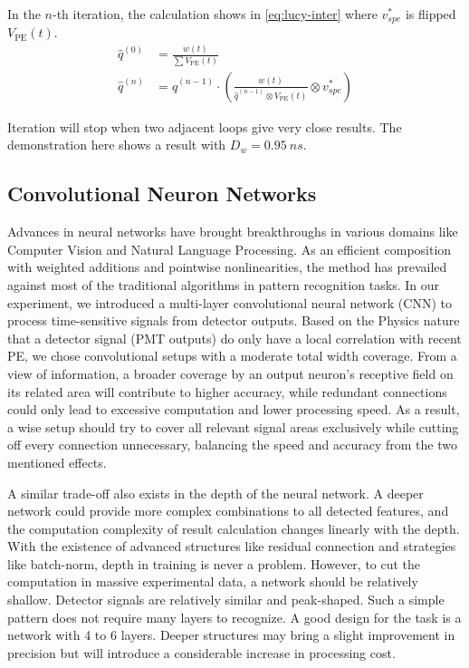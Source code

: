 In the $n$-th iteration, the calculation shows in \eqref{eq:lucy-inter} where $v^{*}_{spe}$ is flipped $V_\mathrm{PE}(t)$. 
\begin{align}
    \hat{q}^{(0)} &= \frac{w(t)}{\sum V_\mathrm{PE}(t)} \\
    \hat{q}^{(n)} &= \hat{q}^{(n-1)} \cdot \left(\frac{w(t)}{\hat{q}^{(n-1)} \otimes V_\mathrm{PE}(t)} \otimes v^{*}_{spe}\right) \label{eq:lucy-inter}
\end{align}

Iteration will stop when two adjacent loops give very close results. The demonstration here shows a result with $D_w = \SI{0.95}{ns}$. 

\subsection{Convolutional Neuron Networks}

Advances in neural networks have brought breakthroughs in various domains like Computer Vision and Natural Language Processing. As an efficient composition with weighted additions and pointwise nonlinearities, the method has prevailed against most of the traditional algorithms in pattern recognition tasks. In our experiment, we introduced a multi-layer convolutional neural network (CNN) to process time-sensitive signals from detector outputs. Based on the Physics nature that a detector signal (PMT outputs) do only have a local correlation with recent PE, we chose convolutional setups with a moderate total width coverage. From a view of information, a broader coverage by an output neuron's receptive field on its related area will contribute to higher accuracy, while redundant connections could only lead to excessive computation and lower processing speed. As a result, a wise setup should try to cover all relevant signal areas exclusively while cutting off every connection unnecessary, balancing the speed and accuracy from the two mentioned effects.

A similar trade-off also exists in the depth of the neural network. A deeper network could provide more complex combinations to all detected features, and the computation complexity of result calculation changes linearly with the depth. With the existence of advanced structures like residual connection and strategies like batch-norm, depth in training is never a problem. However, to cut the computation in massive experimental data, a network should be relatively shallow. Detector signals are relatively similar and peak-shaped. Such a simple pattern does not require many layers to recognize. A good design for the task is a network with 4 to 6 layers. Deeper structures may bring a slight improvement in precision but will introduce a considerable increase in processing cost.

